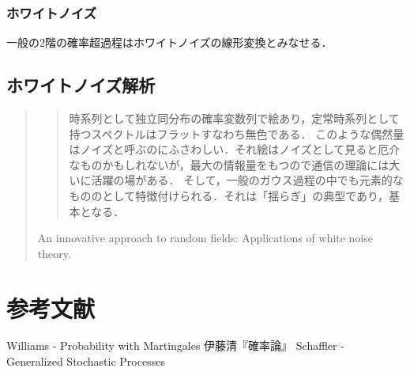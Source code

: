\documentclass[uplatex,dvipdfmx]{jsreport}
\begin{document}
\subsection{ホワイトノイズ}

\begin{tcolorbox}[colframe=ForestGreen, colback=ForestGreen!10!white,breakable,colbacktitle=ForestGreen!40!white,coltitle=black,fonttitle=\bfseries\sffamily,
title=]
    一般の2階の確率超過程はホワイトノイズの線形変換とみなせる．
\end{tcolorbox}

\section{ホワイトノイズ解析}

\begin{quotation}
    \begin{quote}
        時系列として独立同分布の確率変数列で絵あり，定常時系列として持つスペクトルはフラットすなわち無色である．
        このような偶然量はノイズと呼ぶのにふさわしい．それ絵はノイズとして見ると厄介なものかもしれないが，最大の情報量をもつので通信の理論には大いに活躍の場がある．
        そして，一般のガウス過程の中でも元素的なもののとして特徴付けられる．それは「揺らぎ」の典型であり，基本となる．
    \end{quote}
    An innovative approach to random fields: Applications of white noise theory.
\end{quotation}

\chapter{参考文献}

\begin{thebibliography}{99}
    Williams - Probability with Martingales
    伊藤清『確率論』
    Schaffler - Generalized Stochastic Processes
\end{thebibliography}
\end{document}
